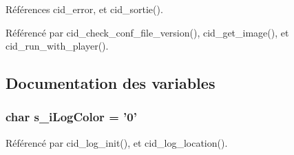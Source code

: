 Références cid\_\-error, et cid\_\-sortie().

Référencé par cid\_\-check\_\-conf\_\-file\_\-version(), cid\_\-get\_\-image(), et cid\_\-run\_\-with\_\-player().

\subsection{Documentation des variables}
\subsubsection{\setlength{\rightskip}{0pt plus 5cm}char {\bf s\_\-iLogColor} = '0'}\label{cid-messages_8c_860436ba179bdc7bc86455fc8d306759}




Référencé par cid\_\-log\_\-init(), et cid\_\-log\_\-location().